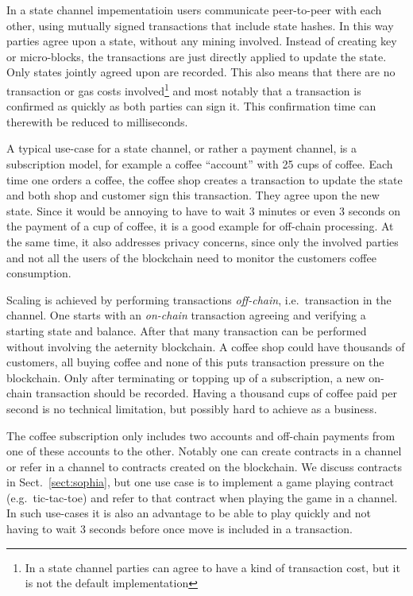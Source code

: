 In a state channel impementatioin users communicate peer-to-peer with
each other, using mutually signed transactions that include state
hashes. In this way parties agree upon a state, without any
mining involved. Instead of creating key or micro-blocks, the transactions are just
directly applied to update the state. Only states
jointly agreed upon are recorded. This also
means that there are no transaction or gas costs involved\footnote{In a state
channel parties can agree to have a kind of transaction cost, but it
is not the default implementation} and most notably that a transaction
is confirmed as quickly as both parties can sign it. This confirmation
time can therewith be reduced to milliseconds.

A typical use-case for a state channel, or rather a payment channel, is a subscription model, for
example a coffee ``account'' with 25 cups of coffee. Each time one
orders a coffee, the coffee shop
creates a transaction to update the state and both shop
and customer sign this transaction. They agree upon the new state.
Since it would be annoying to have to wait 3 minutes or even 3 seconds
on the payment of a cup of coffee, it is a good example for off-chain
processing. At the same time, it also addresses privacy concerns,
since only the involved parties and not all the users of the
blockchain need to monitor the customers coffee consumption.

Scaling is achieved by performing transactions \textit{off-chain},
i.e.\ transaction in the channel. One starts with an \textit{on-chain}
transaction agreeing and verifying a starting state and balance. After
that many transaction can be performed without involving the aeternity
blockchain. A coffee shop could have thousands of customers, all buying coffee and none of
this puts transaction pressure on the blockchain. Only after
terminating or topping up of a subscription, a new on-chain
transaction should be recorded. Having a thousand cups of coffee paid
per second is no technical limitation, but possibly hard to achieve as
a business.

The coffee subscription only includes two accounts and off-chain
payments from one of these accounts to the other.
Notably one
can create contracts in a channel or refer in a channel to contracts
created on the blockchain. We discuss contracts in Sect.\
\ref{sect:sophia}, but one use case is to implement a game playing
contract (e.g.\ tic-tac-toe) and refer to that contract when playing the
game in a channel. In such use-cases it is also an advantage to be
able to play quickly and not having to wait 3 seconds before once move
is included in a transaction.

